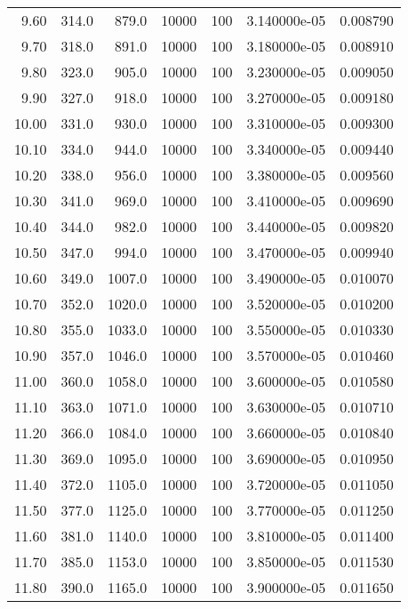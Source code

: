 \begin{tabular}{rrrrrrr}
    9.60 &     314.0 &     879.0 & 10000 &  100 & 3.140000e-05 & 0.008790 \\
    9.70 &     318.0 &     891.0 & 10000 &  100 & 3.180000e-05 & 0.008910 \\
    9.80 &     323.0 &     905.0 & 10000 &  100 & 3.230000e-05 & 0.009050 \\
    9.90 &     327.0 &     918.0 & 10000 &  100 & 3.270000e-05 & 0.009180 \\
   10.00 &     331.0 &     930.0 & 10000 &  100 & 3.310000e-05 & 0.009300 \\
   10.10 &     334.0 &     944.0 & 10000 &  100 & 3.340000e-05 & 0.009440 \\
   10.20 &     338.0 &     956.0 & 10000 &  100 & 3.380000e-05 & 0.009560 \\
   10.30 &     341.0 &     969.0 & 10000 &  100 & 3.410000e-05 & 0.009690 \\
   10.40 &     344.0 &     982.0 & 10000 &  100 & 3.440000e-05 & 0.009820 \\
   10.50 &     347.0 &     994.0 & 10000 &  100 & 3.470000e-05 & 0.009940 \\
   10.60 &     349.0 &    1007.0 & 10000 &  100 & 3.490000e-05 & 0.010070 \\
   10.70 &     352.0 &    1020.0 & 10000 &  100 & 3.520000e-05 & 0.010200 \\
   10.80 &     355.0 &    1033.0 & 10000 &  100 & 3.550000e-05 & 0.010330 \\
   10.90 &     357.0 &    1046.0 & 10000 &  100 & 3.570000e-05 & 0.010460 \\
   11.00 &     360.0 &    1058.0 & 10000 &  100 & 3.600000e-05 & 0.010580 \\
   11.10 &     363.0 &    1071.0 & 10000 &  100 & 3.630000e-05 & 0.010710 \\
   11.20 &     366.0 &    1084.0 & 10000 &  100 & 3.660000e-05 & 0.010840 \\
   11.30 &     369.0 &    1095.0 & 10000 &  100 & 3.690000e-05 & 0.010950 \\
   11.40 &     372.0 &    1105.0 & 10000 &  100 & 3.720000e-05 & 0.011050 \\
   11.50 &     377.0 &    1125.0 & 10000 &  100 & 3.770000e-05 & 0.011250 \\
   11.60 &     381.0 &    1140.0 & 10000 &  100 & 3.810000e-05 & 0.011400 \\
   11.70 &     385.0 &    1153.0 & 10000 &  100 & 3.850000e-05 & 0.011530 \\
   11.80 &     390.0 &    1165.0 & 10000 &  100 & 3.900000e-05 & 0.011650 \\

\end{tabular}

